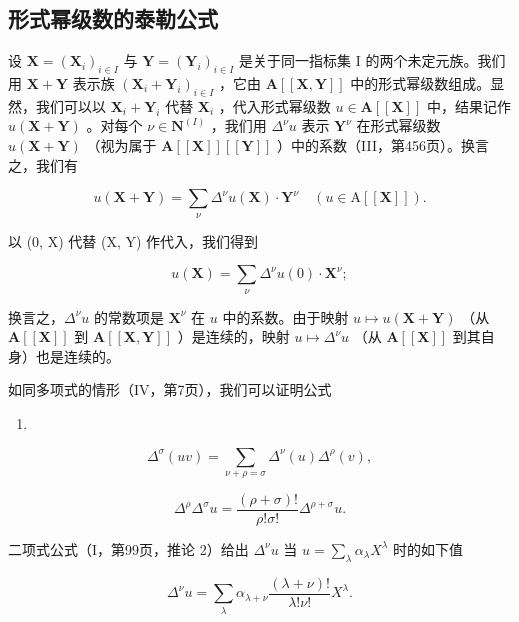 \subsection{形式幂级数的泰勒公式}

设 \(\mathbf{X} = (\mathbf{X}_i)_{i\in I}\) 与 \(\mathbf{Y} = (\mathbf{Y}_i)_{i\in I}\) 是关于同一指标集 I 的两个未定元族。我们用 \(\mathbf{X} + \mathbf{Y}\) 表示族 \((\mathbf{X}_i + \mathbf{Y}_i)_{i\in I}\) ，它由 \(\mathbf{A}[[\mathbf{X},\mathbf{Y}]]\) 中的形式幂级数组成。显然，我们可以以 \(\mathbf{X}_i + \mathbf{Y}_i\) 代替 \(\mathbf{X}_i\) ，代入形式幂级数 \(u\in \mathbf{A}[[\mathbf{X}]]\) 中，结果记作 \(u(\mathbf{X} + \mathbf{Y})\) 。对每个 \(\nu \in \mathbf{N}^{(I)}\) ，我们用 \(\Delta^{\nu}u\) 表示 \(\mathbf{Y}^{\nu}\) 在形式幂级数 \(u(\mathbf{X} + \mathbf{Y})\) （视为属于 \(\mathbf{A}[[\mathbf{X}]][[\mathbf{Y}]]\) ）中的系数（III，第456页）。换言之，我们有

\[
u (\mathbf {X} + \mathbf {Y}) = \sum_ {\nu} \Delta^ {\nu} u (\mathbf {X}) \cdot \mathbf {Y} ^ {\nu} \quad (u \in \mathrm{A} [ [ \mathbf {X} ] ]).\tag{6}
\]

以 (0, X) 代替 (X, Y) 作代入，我们得到

\[
u (\mathbf {X}) = \sum_ {\nu} \Delta^ {\nu} u (0) \cdot \mathbf {X} ^ {\nu};\tag{7}
\]

换言之，\(\Delta^{\nu}u\) 的常数项是 \(\mathbf{X}^{\nu}\) 在 \(u\) 中的系数。由于映射 \(u \mapsto u(\mathbf{X} + \mathbf{Y})\) （从 \(\mathbf{A}[[\mathbf{X}]]\) 到 \(\mathbf{A}[[\mathbf{X}, \mathbf{Y}]]\) ）是连续的，映射 \(u \mapsto \Delta^{\nu}u\) （从 \(\mathbf{A}[[\mathbf{X}]]\) 到其自身）也是连续的。

如同多项式的情形（IV，第7页），我们可以证明公式

\begin{enumerate}
\def\labelenumi{(\arabic{enumi})}
\setcounter{enumi}{7}
\tightlist
\item
\end{enumerate}

\[
\Delta^ {\sigma} (u v) = \sum_ {\nu + \rho = \sigma} \Delta^ {\nu} (u) \Delta^ {\rho} (v),
\]

\[
\Delta^ {\rho} \Delta^ {\sigma} u = \frac {(\rho + \sigma) !}{\rho ! \sigma !} \Delta^ {\rho + \sigma} u.\tag{9}
\]

二项式公式（I，第99页，推论 2）给出 \(\Delta^{\nu}u\) 当 \(u = \sum_{\lambda} \alpha_{\lambda} X^{\lambda}\) 时的如下值

\[
\Delta^ {\nu} u = \sum_ {\lambda} \alpha_ {\lambda + \nu} \frac {(\lambda + \nu) !}{\lambda ! \nu !} X ^ {\lambda}.\tag{10}
\]

